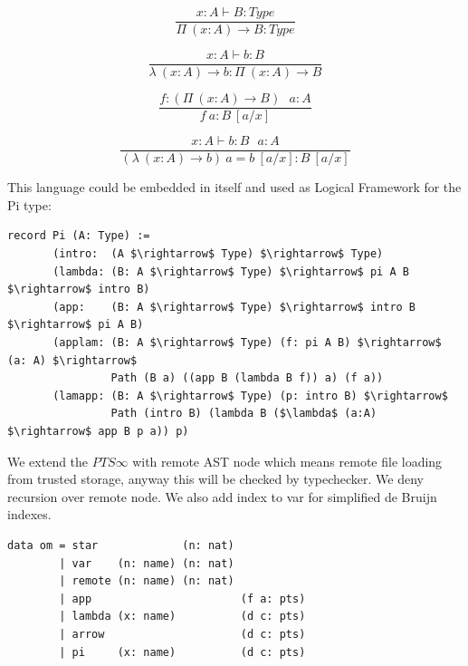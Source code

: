 \documentclass[11pt,oneside]{article}
\begin{document}
\begin{equation}
\tag{$\Pi$-formation}
\dfrac
{x:A \vdash B : Type}
{\Pi\ (x:A) \rightarrow B : Type}
\end{equation}

\begin{equation}
\tag{$\lambda$-intro}
\dfrac
{x:A \vdash b : B}
{\lambda\ (x:A) \rightarrow b : \Pi\ (x: A) \rightarrow B }
\end{equation}

\begin{equation}
\tag{$App$-elimination}
\dfrac
{f: (\Pi\ (x:A) \rightarrow B)\ \ \ a: A}
{f\ a : B\ [a/x]}
\end{equation}

\begin{equation}
\tag{$\beta$-computation}
\dfrac
{x:A \vdash b: B\ \ \ a:A}
{(\lambda\ (x:A) \rightarrow b)\ a = b\ [a/x] : B\ [a/x]}
\end{equation}

\vspace{0.5cm}
This language could be embedded in itself and used
as Logical Framework for the Pi type:

\begin{lstlisting}[mathescape=true]
record Pi (A: Type) :=
       (intro:  (A $\rightarrow$ Type) $\rightarrow$ Type)
       (lambda: (B: A $\rightarrow$ Type) $\rightarrow$ pi A B $\rightarrow$ intro B)
       (app:    (B: A $\rightarrow$ Type) $\rightarrow$ intro B $\rightarrow$ pi A B)
       (applam: (B: A $\rightarrow$ Type) (f: pi A B) $\rightarrow$ (a: A) $\rightarrow$
                Path (B a) ((app B (lambda B f)) a) (f a))
       (lamapp: (B: A $\rightarrow$ Type) (p: intro B) $\rightarrow$
                Path (intro B) (lambda B ($\lambda$ (a:A) $\rightarrow$ app B p a)) p)

\end{lstlisting}

We extend the $PTS\infty$ with remote AST node which means remote file loading
from trusted storage, anyway this will be checked by typechecker. We deny recursion
over remote node. We also add index to var for simplified de Bruijn indexes.

\begin{lstlisting}[mathescape=true]
data om = star             (n: nat)
        | var    (n: name) (n: nat)
        | remote (n: name) (n: nat)
        | app                       (f a: pts)
        | lambda (x: name)          (d c: pts)
        | arrow                     (d c: pts)
        | pi     (x: name)          (d c: pts)
\end{lstlisting}
\end{document}
